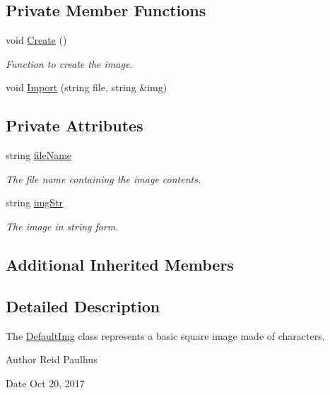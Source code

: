 \subsection*{Private Member Functions}
\begin{DoxyCompactItemize}
\item 
void \hyperlink{classImportImg_a7e1cc1bf176cedb14938519950719fa2}{Create} ()
\begin{DoxyCompactList}\small\item\em Function to create the image. \end{DoxyCompactList}\item 
void \hyperlink{classImportImg_a20bf0509a73e9c08e89518a2ea9a868a}{Import} (string file, string \&img)
\end{DoxyCompactItemize}
\subsection*{Private Attributes}
\begin{DoxyCompactItemize}
\item 
string \hyperlink{classImportImg_a153117d9186b4d7317259ea9dd4c47b1}{file\-Name}
\begin{DoxyCompactList}\small\item\em The file name containing the image contents. \end{DoxyCompactList}\item 
string \hyperlink{classImportImg_a3529487bc41c4ae9a7926b09aec05305}{img\-Str}
\begin{DoxyCompactList}\small\item\em The image in string form. \end{DoxyCompactList}\end{DoxyCompactItemize}
\subsection*{Additional Inherited Members}


\subsection{Detailed Description}
The \hyperlink{classDefaultImg}{Default\-Img} class represents a basic square image made of characters. 

\begin{DoxyAuthor}{Author}
Reid Paulhus 
\end{DoxyAuthor}
\begin{DoxyDate}{Date}
Oct 20, 2017 
\end{DoxyDate}


